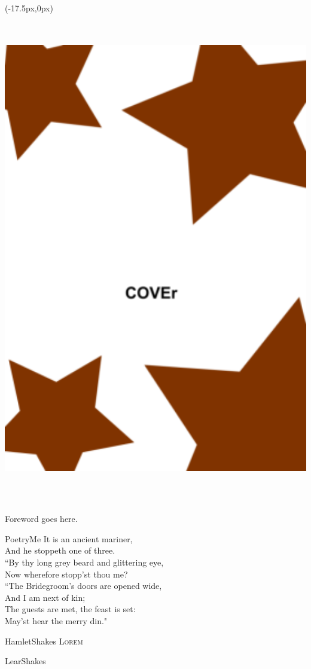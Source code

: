 \documentclass[12pt,twoside]{article}
\begin{document}
\addtocounter{page}{-3}

\thispagestyle{empty}
\begin{textblock*}{8.5in}(-17.5px,0px)%
\includegraphics[width=5.5in, height=8.5in]{cover.png}
\end{textblock*} 
\lipsum[1]
\newpage


\garamond

\thispagestyle{empty}
Foreword goes here.
\newpage

\thispagestyle{empty}
\tableofcontents
\newpage

\begin{verseEntry}{Poetry}{Me}
It is an ancient mariner, \\ 
And he stoppeth one of three. \\ 
``By thy long grey beard and glittering eye, \\ 
Now wherefore stopp'st thou me?\\
\bigskip
``The Bridegroom's doors are opened wide,\\ 
And I am next of kin;\\ 
The guests are met, the feast is set:\\ 
May'st hear the merry din." 
\end{verseEntry}


\begin{proseEntry}{Hamlet}{Shakes}
\lettrine{L}{orem}
\lipsum[1-2]
\end{proseEntry}

\begin{proseEntry}{Lear}{Shakes}
\lipsum[3-4]
\end{proseEntry}
\end{document}
